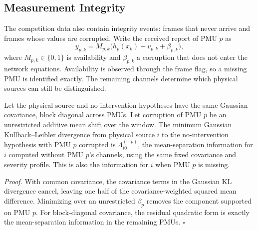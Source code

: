 \subsection{Measurement Integrity}
\label{sec:integrity-theory}
The competition data also contain integrity events: frames that never
arrive and frames whose values are corrupted. Write the received report of
PMU $p$ as
\begin{equation}
 y_{p,k}=M_{p,k}\big(h_p(x_k)+v_{p,k}+\beta_{p,k}\big),
 \label{eq:integrity-observation}
\end{equation}
where $M_{p,k}\in\{0,1\}$ is availability and $\beta_{p,k}$ a corruption
that does not enter the network equations. Availability is observed through
the frame flag, so a missing PMU is identified exactly. The remaining channels determine which physical sources can still be distinguished.

\begin{proposition}\label{prop:integrity}
Let the physical-source and no-intervention hypotheses have the same
Gaussian covariance, block diagonal across PMUs. Let corruption of PMU $p$
be an unrestricted additive mean shift over the window. The minimum
Gaussian Kullback--Leibler divergence from physical source $i$ to the
no-intervention hypothesis with PMU $p$ corrupted is
$\Lambda_{i0}^{(-p)}$, the mean-separation information for $i$ computed
without PMU $p$'s channels, using the same fixed covariance and severity
profile. This is also the information for $i$ when PMU $p$ is missing.
\end{proposition}
\emph{Proof.} With common covariance, the covariance terms in the Gaussian
KL divergence cancel, leaving one half of the covariance-weighted squared
mean difference. Minimizing over an unrestricted $\beta_p$ removes the
component supported on PMU $p$. For block-diagonal covariance, the residual
quadratic form is exactly the mean-separation information in the remaining
PMUs. \hfill$\square$

